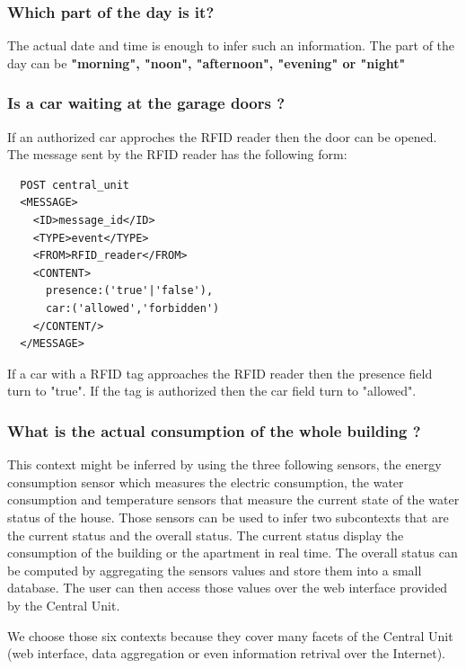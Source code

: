 \documentclass{acm_proc_article-sp}
\begin{document}
  \subsubsection*{Which part of the day is it?}
  The actual date and time is enough to infer such an information.
  The part of the day can be \textbf{"morning", "noon", "afternoon", "evening" or "night"}
 \subsubsection*{Is a car waiting at the garage doors ?}
 If an authorized car approches the RFID reader then the door can be opened.
 The message sent by the RFID reader has the following form:
  \begin{verbatim}
  POST central_unit 
  <MESSAGE>
    <ID>message_id</ID>
    <TYPE>event</TYPE>
    <FROM>RFID_reader</FROM>
    <CONTENT>
      presence:('true'|'false'),
      car:('allowed','forbidden')
    </CONTENT/>
  </MESSAGE> 
\end{verbatim}
If a car with a RFID tag approaches the RFID reader then the presence field turn to "true". If the tag is authorized then the car field turn to "allowed".
 \subsubsection*{What is the actual consumption of the whole building ?}
 This context might be inferred by using the three following sensors, the energy consumption sensor which measures the electric consumption, 
 the water consumption and temperature sensors that measure the current state of the water status of the house.
 Those sensors can be used to infer two subcontexts that are the current status and the overall status.
 The current status display the consumption of the building or the apartment in real time.
 The overall status can be computed by aggregating the sensors values and store them into a small database.
 The user can then access those values over the web interface provided by the Central Unit.

We choose those six contexts because they cover many facets of the Central Unit (web interface, data aggregation or even information retrival over the Internet).
\end{document}
